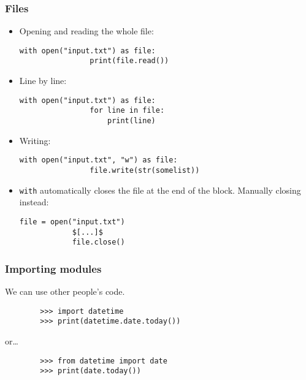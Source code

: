 \documentclass[notes]{beamer}
\begin{document}
	\begin{frame}[fragile]
		\frametitle{Files}
		
		\begin{itemize}
			\item Opening and reading the whole file:
			\begin{lstlisting}[xleftmargin=\dimexpr-\leftmargini]
			with open("input.txt") as file:
			    print(file.read())
			\end{lstlisting}
			
			\pause
			
			\item Line by line:
			\begin{lstlisting}[xleftmargin=\dimexpr-\leftmargini]
			with open("input.txt") as file:
			    for line in file:
			        print(line)
			\end{lstlisting}
			
			\pause
			
			\item Writing:
			\begin{lstlisting}[xleftmargin=\dimexpr-\leftmargini]
			with open("input.txt", "w") as file:
			    file.write(str(somelist))
			\end{lstlisting}
			
			\pause
			
			\item \lstinline|with| automatically closes the file at the end of the block. Manually closing instead:
			
			\begin{lstlisting}[xleftmargin=\dimexpr-\leftmargini]
			file = open("input.txt")
			$[...]$
			file.close()
			\end{lstlisting}
		\end{itemize}
	\end{frame}
	
	\begin{frame}[fragile]
		\frametitle{Importing modules}
		We can use other people's code.
		\begin{lstlisting}
		>>> import datetime
		>>> print(datetime.date.today())
		\end{lstlisting}
		\pause
		or\dots
		\begin{lstlisting}
		>>> from datetime import date
		>>> print(date.today())
		\end{lstlisting}
	\end{frame}
\end{document}
